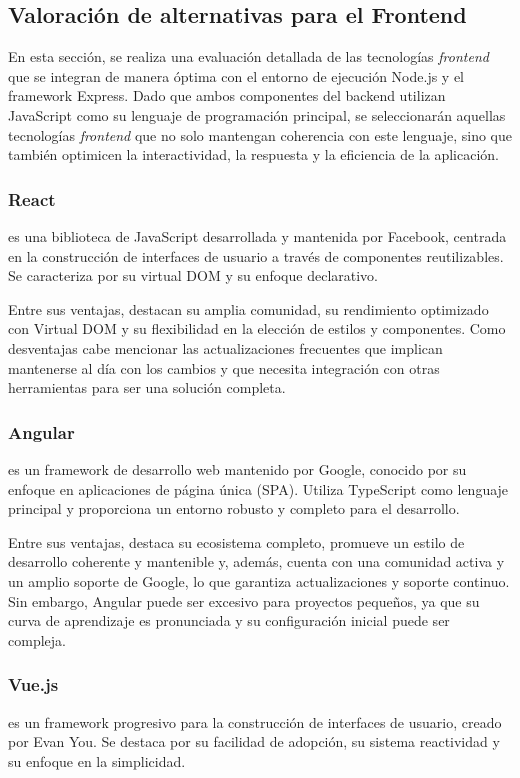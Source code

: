 \subsection{Valoración de alternativas para el Frontend}
En esta sección, se realiza una evaluación detallada de las tecnologías \textit{frontend} que se integran de manera óptima con el entorno de ejecución Node.js 
y el framework Express. Dado que ambos componentes del backend utilizan JavaScript como su lenguaje de programación principal, 
se seleccionarán aquellas tecnologías \textit{frontend} que no solo mantengan coherencia con este lenguaje, sino que también optimicen la interactividad, 
la respuesta y la eficiencia de la aplicación.

\subsubsection{React}
 es una biblioteca de JavaScript desarrollada y mantenida por Facebook, centrada en la construcción de interfaces de usuario a través de componentes reutilizables. Se caracteriza por su virtual DOM y su enfoque declarativo.

Entre sus ventajas, destacan su amplia comunidad, su rendimiento optimizado con Virtual DOM y su flexibilidad en la elección de estilos y componentes. 
Como desventajas cabe mencionar las actualizaciones frecuentes que implican mantenerse al día con los cambios y que necesita integración con otras herramientas para ser una solución completa.


\subsubsection{Angular}
 es un framework de desarrollo web mantenido por Google, conocido por su enfoque en aplicaciones de página única (SPA). Utiliza TypeScript como lenguaje principal y proporciona un entorno robusto y completo para el desarrollo.

Entre sus ventajas, destaca su ecosistema completo, promueve un estilo de desarrollo coherente y mantenible y, además, cuenta con una comunidad activa y un amplio soporte de Google, lo que garantiza actualizaciones y soporte continuo.
Sin embargo, Angular puede ser excesivo para proyectos pequeños, ya que su curva de aprendizaje es pronunciada y su configuración inicial puede ser compleja.

\subsubsection{Vue.js}
 es un framework progresivo para la construcción de interfaces de usuario, creado por Evan You. Se destaca por su facilidad de adopción, su sistema reactividad y su enfoque en la simplicidad.

